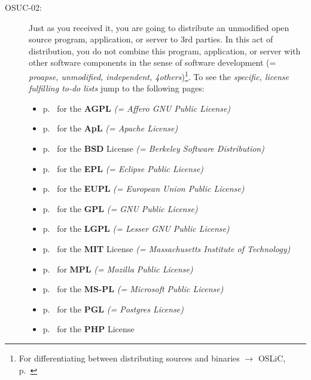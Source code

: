 \begin{description}
\item[OSUC-02:]\label{OSUC-02-DEF} Just as you received it, you are going to
distribute an unmodified open source program, application, or server to 3rd
parties. In this act of distribution, you do not combine this program,
application, or server with other software components in the sense of software
development (= \textit{proapse, unmodified, independent, 4others})\footnote{For
differentiating between distributing sources and binaries $\rightarrow$ OSLiC,
p.\ \pageref{sec:SourceBinaryDifference}}. To see the \textit{specific, license
fulfilling to-do lists} jump to the following pages:
   \begin{itemize}
    \item p.\ \pageref{OSUC-02-AGPL} for the \textbf{AGPL}
      \textit{(= Affero GNU Public License)} 
    \item p.\ \pageref{OSUC-02-Apache20} for the \textbf{ApL}
      \textit{(= Apache License)}
    \item p.\ \pageref{OSUC-02-BSD} for the \textbf{BSD} License
      \textit{(= Berkeley Software Distribution)}
    \item p.\ \pageref{OSUC-02-EPL} for the \textbf{EPL}
      \textit{(= Eclipse Public License)}     
    \item p.\ \pageref{OSUC-02-EUPL} for the \textbf{EUPL}
      \textit{(= European Union Public License)} 
    \item p.\ \pageref{OSUC-02-GPL} for the \textbf{GPL}
       \textit{(= GNU Public License)} 
    \item p.\ \pageref{OSUC-02-LGPL} for the \textbf{LGPL}
      \textit{(= Lesser GNU Public License)}           
    \item p.\ \pageref{OSUC-02-MIT} for the \textbf{MIT} License
       \textit{(= Massachusetts Institute of Technology)} 
    \item p.\ \pageref{OSUC-02-MPL} for \textbf{MPL}
      \textit{(= Mozilla Public License)}     
    \item p.\ \pageref{OSUC-02-MS-PL} for the \textbf{MS-PL}
      \textit{(= Microsoft Public License)} 
    \item p.\ \pageref{OSUC-02-PGL} for the \textbf{PGL}
      \textit{(= Postgres License)} 
    \item p.\ \pageref{OSUC-02-PHP} for the \textbf{PHP} License 
  \end{itemize}


\end{description}
